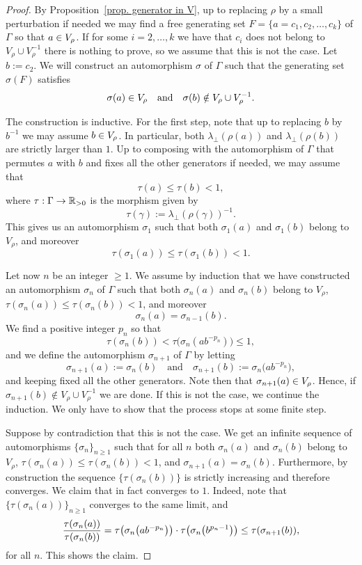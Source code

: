 \documentclass[AHL,Unicode,longabstracts]{cedram}
\newcommand{\R}{\mathbb{R}}
\renewcommand*{\to}{\mathchoice{\longrightarrow}{\rightarrow}{\rightarrow}{\rightarrow}}
\let\originalleft\left
\let\originalright\right
\renewcommand{\left}{\mathopen{}\mathclose\bgroup\originalleft}
\renewcommand{\right}{\aftergroup\egroup\originalright}
\let\oldin\in
\renewcommand{\in}{\mathchoice{\oldin}{\oldin}{\,\oldin\,}{\,\oldin\,}}
\begin{document}
\begin{proof}
By Proposition~\ref{prop. generator in V}, up to replacing $\rho$ by a small perturbation if needed we may find a free generating set $F=\{a=c_1,c_2,\dots,c_k\}$ of $\Gamma$ so that $a\in V_\rho$. If for some $i=2,\dots,k$ we have that $c_i$ does not belong to $ V_{\rho}\cup V_{\rho}^{-1}$ there is nothing to prove, so we assume that this is not the case. Let $b:=c_2$.
We will construct an automorphism $\sigma$ of $\Gamma$ such that the generating set $\sigma(F)$ satisfies
\[
\sigma(a)\in V_{\rho} \quad\text{and}\quad \sigma(b)\notin V_{\rho}\cup V_{\rho}^{-1}.
\]


The construction is inductive. For the first step, note that up to replacing $b$ by $b^{-1}$ we may assume $b\in V_\rho$. In particular, both $\lambda_\perp(\rho(a))$ and $\lambda_\perp(\rho(b))$ are strictly larger than $1$.
Up to composing with the automorphism of $\Gamma$ that permutes $a$ with $b$ and fixes all the other generators if needed, we may assume that
\[
\tau(a)\leq\tau(b)<1,
\]
where $\tau:\Gamma\to\R_{>0}$ is the morphism given by
\[
\tau(\gamma):=
\lambda_\perp(\rho(\gamma))^{-1}.
\]
This gives us an automorphism $\sigma_1$ such that both $\sigma_1(a)$ and $\sigma_1(b)$ belong to $V_\rho$, and moreover
\[
\tau(\sigma_1(a))\leq\tau(\sigma_1(b))<1.
\]


Let now $n$ be an integer $\geq 1$.
We assume by induction that we have constructed an automorphism $\sigma_n$ of $\Gamma$ such that both $\sigma_n(a)$ and $\sigma_n(b)$ belong to $V_\rho$, $\tau(\sigma_n(a))\leq\tau(\sigma_n(b))<1$, and moreover
\[
\sigma_n(a)=\sigma_{n-1}(b).
\]
We find a positive integer $p_n$ so that
\[
\tau(\sigma_n(b))<\tau\bigl(\sigma_n(ab^{-p_n})\bigr)\leq 1,
\]
and we define the automorphism $\sigma_{n+1}$ of $\Gamma$ by letting
\[
\sigma_{n+1}(a):=\sigma_n(b) \quad\text{and}\quad \sigma_{n+1}(b):=\sigma_n\bigl(ab^{-p_n}\bigr),
\]
and keeping fixed all the other generators. Note then that $\sigma_{n+1}(a)\in V_\rho$. Hence, if $\sigma _{n+1}(b)\notin V_{\rho}\cup V_{\rho}^{-1}$ we are done. If this is not the case, we continue the induction. We only have to show that the process stops at some finite step.

Suppose by contradiction that this is not the case. We get an infinite sequence of automorphisms $\{\sigma_n\}_{n\geq 1}$ such that for all $n$ both $\sigma_n(a)$ and $\sigma_n(b)$ belong to $V_\rho$, $\tau(\sigma_n(a))\leq\tau(\sigma_n(b))<1$, and $\sigma_{n+1}(a)=\sigma_n(b)$. Furthermore, by construction the sequence $\{\tau(\sigma_n(b))\}$ is strictly increasing and therefore converges. We claim that in fact converges to $1$. Indeed, note that $\{\tau(\sigma_n(a))\}_{n\geq 1}$ converges to the same limit, and
\[
\frac{\tau(\sigma_n(a))}{\tau(\sigma_n(b))}=\tau\left(\sigma_n\left(ab^{-p_n}\right)\right)\cdot \tau\left(\sigma_n\left(b^{p_n-1}\right)\right)\leq \tau(\sigma_{n+1}(b)),
\]
for all $n$.
This shows the claim.


\end{proof}
\end{document}
